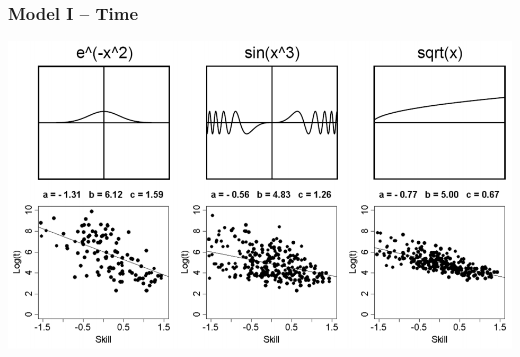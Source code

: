 \documentclass[xcolor=svgnames]{beamer}
\begin{document}
\begin{frame}
	\frametitle{Model I -- Time}

	\begin{center}
		\includegraphics[width=.95\textwidth]{2013-VV041-student-modeling/time-model-examples.png}
	\end{center}
\end{frame}
\end{document}

